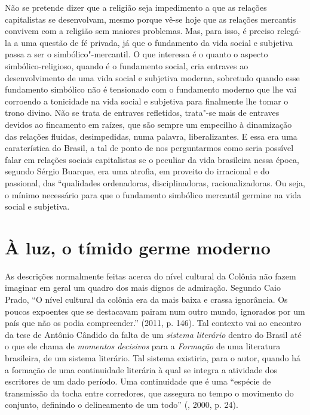 {Não se pretende dizer que a religião seja impedimento a que as relações
capitalistas se desenvolvam, mesmo porque vê-se hoje que as relações
mercantis convivem com a religião sem maiores problemas. Mas, para isso,
é preciso relegá-la a uma questão de fé privada, já que o fundamento da
vida social e subjetiva passa a ser o simbólico"-mercantil. O que interessa
é o quanto o aspecto simbólico-religioso, quando é o fundamento social,
cria entraves ao desenvolvimento de uma vida social e subjetiva moderna,
sobretudo quando esse fundamento simbólico não é tensionado com o
fundamento moderno que lhe vai corroendo a tonicidade na vida social e
subjetiva para finalmente lhe tomar o trono divino. Não se
trata de entraves refletidos, trata"-se mais de entraves devidos ao
fincamento em raízes, que são sempre um empecilho à dinamização das
relações fluidas, desimpedidas, numa palavra, liberalizantes. E essa era
uma caraterística do Brasil, a tal de ponto de nos perguntarmos como
seria possível falar em relações sociais capitalistas se o peculiar da
vida brasileira nessa época, segundo Sérgio Buarque, era uma atrofia, em
proveito do irracional e do passional, das ``qualidades ordenadoras,
disciplinadoras, racionalizadoras. Ou seja, o mínimo necessário para
que o fundamento simbólico mercantil germine na vida social e subjetiva.

\section{À luz, o tímido germe moderno}

As descrições normalmente feitas acerca do nível cultural da Colônia não
fazem imaginar em geral um quadro dos mais dignos de admiração. Segundo
Caio Prado, ``O nível cultural da colônia era da mais baixa e crassa
ignorância. Os poucos expoentes que se destacavam pairam num outro
mundo, ignorados por um país que não os podia compreender.'' (2011, p.
146). Tal contexto vai ao encontro da tese de Antônio Cândido da falta
de um \emph{sistema literário} dentro do Brasil até o que ele chama de
\emph{momentos decisivos} para a \emph{Formação} de uma literatura
brasileira, de um sistema literário. Tal sistema existiria, para o
autor, quando há a formação de uma continuidade literária à qual se
integra a atividade dos escritores de um dado período. Uma continuidade
que é uma ``espécie de transmissão da tocha entre corredores, que
assegura no tempo o movimento do conjunto, definindo o delineamento de
um todo'' (, 2000, p. 24).

}
